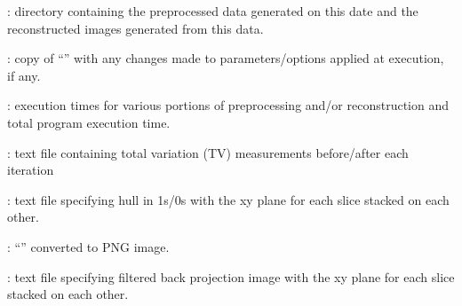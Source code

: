 \begin{tcbfunctionenv}
\begin{tcbparagraph}
\begin{deepList}[labelindent=1pt, leftmargin=*]
\begin{deepList}[labelindent=1pt, leftmargin=*]
\begin{deepList}[labelindent=1pt, leftmargin=*]
\begin{deepList}[labelindent=1pt, leftmargin=*]
\begin{deepList}[labelindent=1pt, leftmargin=*]
\begin{deepList}[labelindent=1pt, leftmargin=*]
\begin{deepList}[labelindent=1pt, leftmargin=*]
\begin{deepList}[labelindent=1pt, leftmargin=*]
                    				\item {} : directory containing the preprocessed data generated on this date and the reconstructed images generated from this data.
                                    \begin{deepList}[labelindent=1pt, leftmargin=*]
                                        \item {} : copy of ``'' with any changes made to parameters/options applied at execution, if any.
                                        \item {} : execution times for various portions of preprocessing and/or reconstruction and total program execution time.
                                        \item {} : text file containing total variation (TV) measurements before/after each iteration
                                        \item {} : text file specifying hull in 1s/0s with the xy plane for each slice stacked on each other.
                                        \item {} : ``'' converted to PNG image.
                                        \item {} : text file specifying filtered back projection image with the xy plane for each slice stacked on each other.
\newpage

\end{deepList}
\end{deepList}
\end{deepList}
\end{deepList}
\end{deepList}
\end{deepList}
\end{deepList}
\end{deepList}
\end{deepList}
\end{tcbparagraph}
\end{tcbfunctionenv}
